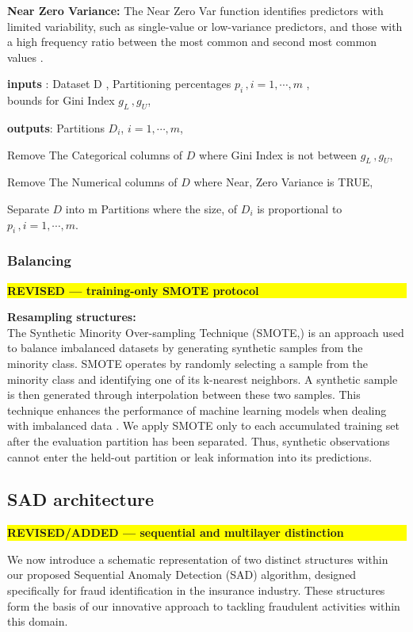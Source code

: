 \documentclass[12pt]{article}
\newenvironment{algorithmic}{%
  \begin{list}{}{\setlength{\leftmargin}{0pt}\setlength{\itemsep}{1pt}}\item[]%
}{\end{list}}
\newcommand{\STATE}{\par\noindent}
\newcommand{\revmark}[1]{\par\noindent\colorbox{yellow}{%
  \parbox{\dimexpr\linewidth-2\fboxsep}{\raggedright\strut\textbf{#1}}}%
  \par\smallskip}
\begin{document}
\textbf{Near Zero Variance:} The Near Zero Var function identifies
predictors with limited variability, such as single-value or
low-variance predictors, and those with a high frequency ratio
between the most common and second most common values \cite{A59}.
        \begin{algorithm}[H]
            \footnotesize
            \caption{PreProcessing Algorithm}\label{algo:preprocessing}
            \begin{algorithmic}
                \STATE \textbf{inputs} :  Dataset D ,   Partitioning percentages $p_i \,, i = 1, \cdots , m$ ,\\ bounds for Gini Index $g_{L} \, , g_{U}$,
                \STATE \textbf{outputs}: Partitions $D_i$, $ i = 1, \cdots , m$,
                \STATE Remove The Categorical columns of $D$ where Gini Index is not between $g_{L} \, , g_{U}$,
                \STATE Remove The Numerical columns of $D$ where Near, Zero Variance is TRUE,
                \STATE Separate  $D$ into m Partitions where the size, of $D_i$ is proportional to $p_i \,, i = 1, \cdots , m$.
            \end{algorithmic}
        \end{algorithm}

\subsubsection*{Balancing}
\revmark{REVISED --- training-only SMOTE protocol}
        \textbf{\small Resampling structures:}\\
The Synthetic Minority Over-sampling Technique (SMOTE,) is an
approach used to balance imbalanced datasets by generating
synthetic samples from the minority class. SMOTE operates by
randomly selecting a sample from the minority class and
identifying one of its k-nearest neighbors. A synthetic sample is
then generated through interpolation between these two samples.
This technique enhances the performance of machine learning models
when dealing with imbalanced data \cite{A62}.
We apply SMOTE only to each accumulated training set after the evaluation
partition has been separated. Thus, synthetic observations cannot enter the
held-out partition or leak information into its predictions.

\subsection{SAD architecture}
\revmark{REVISED/ADDED --- sequential and multilayer distinction}
We now introduce a schematic representation of two distinct
structures within our proposed Sequential Anomaly Detection (SAD)
algorithm, designed specifically for fraud identification in the
insurance industry. These structures form the basis of our
innovative approach to tackling fraudulent activities within this
domain.
\end{document}

